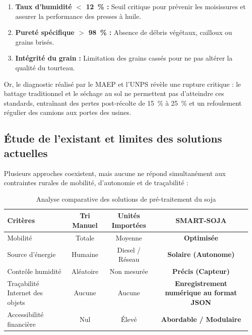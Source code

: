 \begin{enumerate}
    \item \textbf{Taux d'humidité $<$ 12~\% :} Seuil critique pour prévenir les moisissures et assurer la performance des presses à huile.
    \item \textbf{Pureté spécifique $>$ 98~\% :} Absence de débris végétaux, cailloux ou grains brisés.
    \item \textbf{Intégrité du grain :} Limitation des grains cassés pour ne pas altérer la qualité du tourteau.
\end{enumerate}

Or, le diagnostic réalisé par le MAEP et l'UNPS révèle une rupture critique \cite{maep2023, unps2014} : le battage traditionnel et le séchage au sol ne permettent pas d'atteindre ces standards, entraînant des pertes post-récolte de 15~\% à 25~\% et un refoulement régulier des camions aux portes des usines.

\subsection{Étude de l'existant et limites des solutions actuelles}
Plusieurs approches coexistent, mais aucune ne répond simultanément aux contraintes rurales de mobilité, d'autonomie et de traçabilité :

\begin{table}[H]
    \caption{Analyse comparative des solutions de pré-traitement du soja}
    \label{tab:comparaison_soja}
    \centering
    \small
    \renewcommand{\arraystretch}{1.6}
    \begin{tabularx}{\textwidth}{|L|C|C|C|}
        \hline
        \textbf{Critères} &
        \textbf{Tri Manuel} &
        \textbf{Unités Importées} &
        \textbf{SMART-SOJA} \\ \hline
        Mobilité & Totale & Moyenne & \textbf{Optimisée} \\ \hline
        Source d'énergie & Humaine & Diesel / Réseau & \textbf{Solaire (Autonome)} \\ \hline
        Contrôle humidité & Aléatoire & Non mesurée & \textbf{Précis (Capteur)} \\ \hline
        Traçabilité Internet des objets & Aucune & Aucune & \textbf{Enregistrement numérique au format JSON} \\ \hline
        Accessibilité financière & Nul & Élevé & \textbf{Abordable / Modulaire} \\ \hline
    \end{tabularx}
\end{table}

